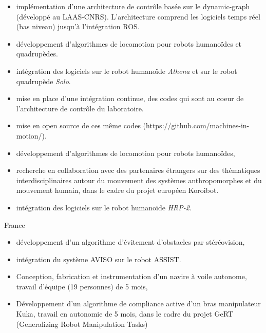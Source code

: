 \documentclass[11pt,a4paper]{moderncv}        %
\newcommand{\items}{\item[*] \hspace{2mm}}
\begin{document}
{
  \begin{itemize}%
    \items impl\'ementation d'une architecture de contr\^ole bas\'ee sur le
    dynamic-graph (d\'evelopp\'e au LAAS-CNRS). L'architecture comprend
    les logiciels temps r\'eel (bas niveau) jusqu'\`a l'int\'egration ROS.
    \items d\'eveloppement d'algorithmes de locomotion pour robots humano\"ides
    et quadrup\`edes.
    \items int\'egration des logiciels sur le robot humano\"ide \emph{Athena} et
    sur le robot quadrup\`ede \emph{Solo}.
    \items mise en place d'une int\'egration continue, des codes qui sont au
    coeur de l'architecture de contr\^ole du laboratoire.
    \items mise en open source de ces m\^eme codes
    (https://github.com/machines-in-motion/).
  \end{itemize}
}
{
  \begin{itemize}%
    \items d\'eveloppement d'algorithmes de locomotion pour robots humano\"ides,
    \items recherche en collaboration avec des partenaires \'etrangers sur des
    th\'ematiques interdisciplinaires autour du mouvement des syst\`emes
    anthropomorphes et du mouvement humain, dans le cadre du projet europ\'een
    Koroibot.
    \items int\'egration des logiciels sur le robot humano\"ide \emph{HRP-2}.
  \end{itemize}
}
%
%
{France}
{
  \begin{itemize}%
    \items d\'eveloppement d'un algorithme d'\'evitement d'obstacles par
    st\'er\'eovision,
    \items int\'egration du syst\`eme AVISO sur le robot ASSIST.
  \end{itemize}
}
%
%
{
  \begin{itemize}%
    \items Conception, fabrication et instrumentation d'un navire \`a voile autonome,
    travail d'\'equipe (19 personnes) de 5 mois,
  \end{itemize}
}
%
%
%
{
  \begin{itemize}%
    \items D\'eveloppement d'un algorithme de compliance active d'un bras manipulateur Kuka,
    travail en autonomie de 5 mois, dans le cadre du projet GeRT (Generalizing Robot Manipulation Tasks)
  \end{itemize}
}
\end{document}
